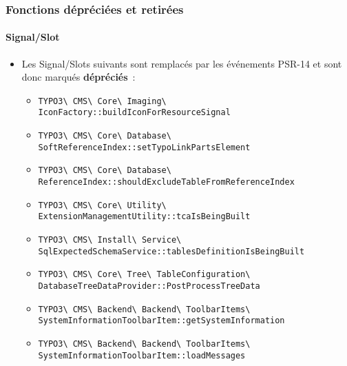 \begin{frame}[fragile]
	\frametitle{Fonctions dépréciées et retirées}
	\framesubtitle{Signal/Slot}

	\lstset{basicstyle=\tiny\ttfamily}

	\begin{itemize}
		\item Les Signal/Slots suivants sont remplacés par les événements PSR-14 et
			sont donc marqués \textbf{dépréciés}~:
			\newline

			\begin{itemize}\tiny
				\item \texttt{TYPO3\textbackslash
					CMS\textbackslash
					Core\textbackslash
					Imaging\textbackslash
					IconFactory::buildIconForResourceSignal}
					\newline
				\item \texttt{TYPO3\textbackslash
					CMS\textbackslash
					Core\textbackslash
					Database\textbackslash
					SoftReferenceIndex::setTypoLinkPartsElement}
					\newline
				\item \texttt{TYPO3\textbackslash
					CMS\textbackslash
					Core\textbackslash
					Database\textbackslash
					ReferenceIndex::shouldExcludeTableFromReferenceIndex}
					\newline
				\item \texttt{TYPO3\textbackslash
					CMS\textbackslash
					Core\textbackslash
					Utility\textbackslash
					ExtensionManagementUtility::tcaIsBeingBuilt}
					\newline
				\item \texttt{TYPO3\textbackslash
					CMS\textbackslash
					Install\textbackslash
					Service\textbackslash
					SqlExpectedSchemaService::tablesDefinitionIsBeingBuilt}
					\newline
				\item \texttt{TYPO3\textbackslash
					CMS\textbackslash
					Core\textbackslash
					Tree\textbackslash
					TableConfiguration\textbackslash
					DatabaseTreeDataProvider::PostProcessTreeData}
					\newline
				\item \texttt{TYPO3\textbackslash
					CMS\textbackslash
					Backend\textbackslash
					Backend\textbackslash
					ToolbarItems\textbackslash
					SystemInformationToolbarItem::getSystemInformation}
					\newline
				\item \texttt{TYPO3\textbackslash
					CMS\textbackslash
					Backend\textbackslash
					Backend\textbackslash
					ToolbarItems\textbackslash
					SystemInformationToolbarItem::loadMessages}

			\end{itemize}

	\end{itemize}

\end{frame}

